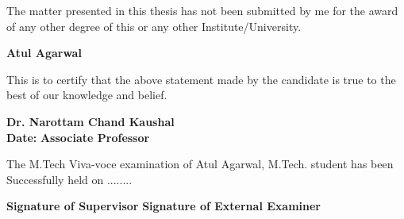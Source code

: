 \par The matter presented in this thesis has not been submitted by me for the award of any other degree of this or any other Institute/University.
\vspace{10mm}
\begin{flushright}
	\textbf{Atul Agarwal \\ 
	}
\end{flushright}
\vspace{5mm}
\par This is to certify that the above statement made by the candidate is true to the best of our knowledge and belief.
\vspace{5mm}
\begin{flushright}
	\textbf{Dr. Narottam Chand Kaushal} \\
		     \textbf{Date:} \hfill \textbf{Associate Professor} \\
		  
\end{flushright}
\vspace{5mm}
\par The M.Tech Viva-voce examination of Atul Agarwal, M.Tech. student has been Successfully held on ........
\vspace{5mm}
\begin{flushright}
\textbf{Signature of Supervisor} \hfill \textbf{Signature of External Examiner}
    
\end{flushright}